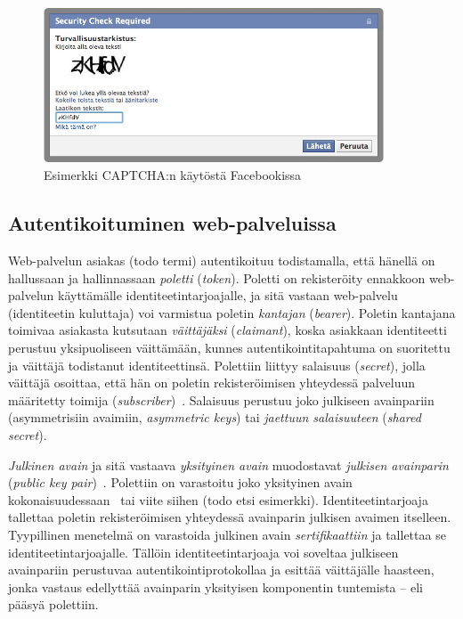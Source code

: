 \documentclass[finnish,gradu]{tktltiki}
\begin{document}
  \begin{figure}
    \centering
    \includegraphics[width=0.9\textwidth]{images/Facebook_captcha_filled.jpg}
    \caption{Esimerkki CAPTCHA:n käytöstä Facebookissa}
    \label{fig:yleiskuva}
  \end{figure}


  \subsection{Autentikoituminen web-palveluissa} %
  \label{sub:autentikoituminen_salasanalla}

  Web-palvelun asiakas (todo termi) autentikoituu todistamalla, että hänellä on hallussaan ja hallinnassaan \emph{poletti} (\emph{token}). Poletti on rekisteröity ennakkoon web-palvelun käyttämälle identiteetintarjoajalle, ja sitä vastaan web-palvelu (identiteetin kuluttaja) voi varmistua poletin \emph{kantajan} (\emph{bearer}). Poletin kantajana toimivaa asiakasta kutsutaan \emph{väittäjäksi} (\emph{claimant}), koska asiakkaan identiteetti perustuu yksipuoliseen väittämään, kunnes autentikointitapahtuma on suoritettu ja väittäjä todistanut identiteettinsä. Polettiin liittyy salaisuus (\emph{secret}), jolla väittäjä osoittaa, että hän on poletin rekisteröimisen yhteydessä palveluun määritetty toimija (\emph{subscriber})~\cite{NIST_SP800-63-1}. Salaisuus perustuu joko julkiseen avainpariin (asymmetrisiin avaimiin, \emph{asymmetric keys}) tai \emph{jaettuun salaisuuteen} (\emph{shared secret}).

  \emph{Julkinen avain} ja sitä vastaava \emph{yksityinen avain} muodostavat \emph{julkisen avainparin} (\emph{public key pair})~\cite{NIST_SP800-63-1}.
  Polettiin on varastoitu joko yksityinen avain kokonaisuudessaan~\cite{NIST_SP800-63-1} tai viite siihen (todo etsi esimerkki).
  Identiteetintarjoaja tallettaa poletin rekisteröimisen yhteydessä avainparin julkisen avaimen itselleen. Tyypillinen menetelmä on varastoida julkinen avain \emph{sertifikaattiin} ja tallettaa se identiteetintarjoajalle. Tällöin identiteetintarjoaja voi soveltaa julkiseen avainpariin perustuvaa autentikointiprotokollaa ja esittää väittäjälle haasteen, jonka vastaus edellyttää avainparin yksityisen komponentin tuntemista -- eli pääsyä polettiin.
\end{document}
